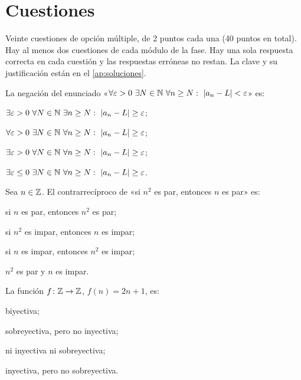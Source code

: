 \chapter{Cuestiones}
\label{cap:test}

Veinte cuestiones de opción múltiple, de 2 puntos cada una (40 puntos en total). Hay al menos dos cuestiones de cada módulo de la fase. Hay una sola respuesta correcta en cada cuestión y las respuestas erróneas no restan. La clave y su justificación están en el \cref{ap:soluciones}.

\begin{cuestiones}
\item {} La negación del enunciado «$\forall\varepsilon>0\ \exists N\in\mathbb{N}\ \forall n\ge N:\ \lvert a_n-L\rvert<\varepsilon$» es:
\begin{opciones}
  \item $\exists\varepsilon>0\ \forall N\in\N\ \exists n\ge N:\ \abs{a_n-L}\ge\varepsilon$;
  \item $\forall\varepsilon>0\ \exists N\in\N\ \forall n\ge N:\ \abs{a_n-L}\ge\varepsilon$;
  \item $\exists\varepsilon>0\ \forall N\in\N\ \forall n\ge N:\ \abs{a_n-L}\ge\varepsilon$;
  \item $\exists\varepsilon\le0\ \exists N\in\N\ \forall n\ge N:\ \abs{a_n-L}\ge\varepsilon$.
\end{opciones}

\item {} Sea $n\in\mathbb{Z}$. El contrarrecíproco de «si $n^{2}$ es par, entonces $n$ es par» es:
\begin{opciones}
  \item si $n$ es par, entonces $n^{2}$ es par;
  \item si $n^{2}$ es impar, entonces $n$ es impar;
  \item si $n$ es impar, entonces $n^{2}$ es impar;
  \item $n^{2}$ es par y $n$ es impar.
\end{opciones}

\item {} La función $f\colon\mathbb{Z}\to\mathbb{Z}$, $f(n)=2n+1$, es:
\begin{opciones}
  \item biyectiva;
  \item sobreyectiva, pero no inyectiva;
  \item ni inyectiva ni sobreyectiva;
  \item inyectiva, pero no sobreyectiva.
\end{opciones}


\end{cuestiones}
